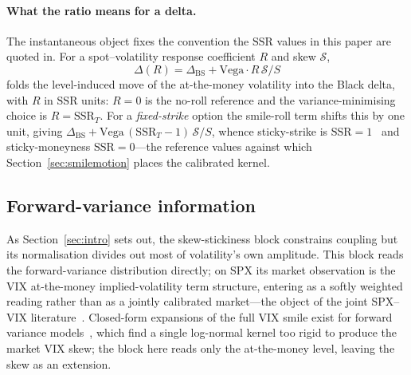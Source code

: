 \documentclass[11pt]{article}
\newcommand{\SSR}{\mathrm{SSR}}
\providecommand{\1}{\mathbf 1}
\begin{document}
\paragraph{What the ratio means for a delta.} The instantaneous object fixes the convention the
$\SSR$ values in this paper are quoted in. For a spot--volatility response coefficient $R$ and skew
$\mathcal{S}$,
\begin{equation}\label{eq:ssr-delta}
  \Delta(R)=\Delta_{\mathrm{BS}}+\mathrm{Vega}\cdot R\,\mathcal{S}/S
\end{equation}
folds the level-induced move of the at-the-money volatility into the Black delta, with $R$ in
$\SSR$ units: $R{=}0$ is the no-roll reference and the variance-minimising choice is $R=\SSR_T$. For
a \emph{fixed-strike} option the smile-roll term shifts this by one unit, giving
$\Delta_{\mathrm{BS}}+\mathrm{Vega}\,(\SSR_T-1)\,\mathcal S/S$, whence sticky-strike is
$\SSR{=}1$~\cite{gatheral2006} and sticky-moneyness $\SSR{=}0$---the reference values against which
Section~\ref{sec:smilemotion} places the calibrated kernel.

\subsection{Forward-variance information}
\label{sec:fwdvar}

As Section~\ref{sec:intro} sets out, the skew-stickiness block constrains coupling but its
normalisation divides out most of volatility's own amplitude. This block reads the forward-variance
distribution directly; on SPX its market observation is the VIX at-the-money implied-volatility term
structure, entering as a softly weighted reading rather than as a jointly calibrated
market---the object of the joint SPX--VIX literature~\cite{guyon2024fs,guo2022siam,che2026pot}. Closed-form expansions of the full VIX smile exist for forward variance
models~\cite{bourgey2023weak,liao2026vix}, which find a single log-normal kernel too rigid to
produce the market VIX skew; the block here reads only the at-the-money level, leaving the skew
as an extension.
\end{document}

